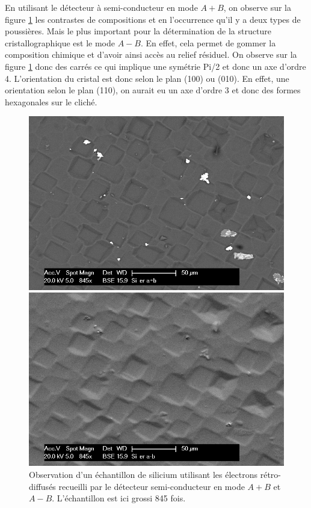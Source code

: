 \documentclass[a4paper,12pt]{article}
\begin{document}
En utilisant le détecteur à semi-conducteur en mode $A+B$, on observe sur la figure \ref{fig:si_er_apb_amb} les contrastes de compositions et en l'occurrence qu'il y a deux types de poussières. Mais le plus important pour la détermination de la structure cristallographique est le mode $A-B$. En effet, cela permet de gommer la composition chimique et d'avoir ainsi accès au relief résiduel. On observe sur la figure \ref{fig:si_er_apb_amb} donc des carrés ce qui implique une symétrie Pi/2 et donc un axe d'ordre 4. L'orientation du cristal est donc selon le plan (100) ou (010). En effet, une orientation selon le plan (110), on aurait eu un axe d'ordre 3 et donc des formes hexagonales sur le cliché.
\begin{figure}
\begin{minipage}[c]{.5\linewidth}
\centering
\includegraphics[width=1\textwidth]{images/si_er_apb.png}
 \end{minipage}\hfill
\begin{minipage}[c]{.5\linewidth}
\centering
\includegraphics[width=1\textwidth]{images/si_er_amb.png}
\end{minipage}
\caption{Observation d'un échantillon de silicium utilisant les électrons rétro-diffusés recueilli par le détecteur semi-conducteur en mode $A+B$ et $A-B$. L'échantillon est ici grossi 845 fois.}
\label{fig:si_er_apb_amb}
\end{figure}
\end{document}
